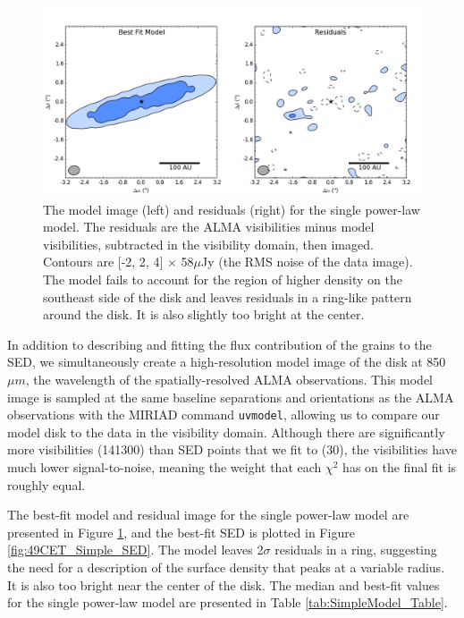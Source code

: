 \begin{figure}[t!]
\centering
\includegraphics[width = 1\textwidth]{49CET_Simple_ModelResidual.png}
\caption{The model image (left) and residuals (right) for the single power-law model. The residuals are the ALMA visibilities minus model visibilities, subtracted in the visibility domain, then imaged. Contours are [-2, 2, 4] $\times$ 58$\mu$Jy (the RMS noise of the data image). The model fails to account for the region of higher density on the southeast side of the disk and leaves residuals in a ring-like pattern around the disk. It is also slightly too bright at the center.}
\label{fig:49CET_Simple_ModelResidual}
\end{figure}

In addition to describing and fitting the flux contribution of the grains to the SED, we simultaneously create a high-resolution model image of the disk at 850$\mu m$, the wavelength of the spatially-resolved ALMA observations. This model image is sampled at the same baseline separations and orientations as the ALMA observations with the MIRIAD command \texttt{uvmodel}, allowing us to compare our model disk to the data in the visibility domain. Although there are significantly more visibilities (141300) than SED points that we fit to (30), the visibilities have much lower signal-to-noise, meaning the weight that each $\chi^{2}$ has on the final fit is roughly equal. 

The best-fit model and residual image for the single power-law model are presented in Figure \ref{fig:49CET_Simple_ModelResidual}, and the best-fit SED is plotted in Figure \ref{fig:49CET_Simple_SED}. The model leaves 2$\sigma$ residuals in a ring, suggesting the need for a description of the surface density that peaks at a variable radius. It is also too bright near the center of the disk. The median and best-fit values for the single power-law  model are presented in Table \ref{tab:SimpleModel_Table}.

